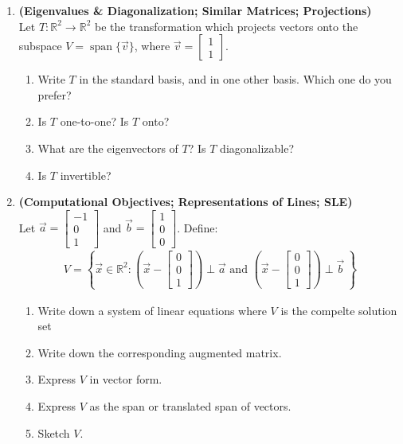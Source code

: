 \documentclass[red]{tutorial}
\newcommand{\R}{\mathbb{R}}
\newcommand{\mat}[1]{\begin{bmatrix} #1 %
\end{bmatrix}}
\DeclareMathOperator{\Span} {span}
\theoremstyle{definition}
\theoremstyle{theorem}
\begin{document}
\begin{tutorial}
\begin{enumerate}
        \item \textbf{(Eigenvalues \& Diagonalization; Similar Matrices; 
          Projections)}\\
          Let $T\colon\R^2\to\R^2$ be the transformation which 
          projects vectors onto the subspace $V=\Span\{\vec v\}$, 
          where $\vec v = \mat{1\\1}$.
          \begin{enumerate}
            \item Write $T$ in the standard basis, and in one other basis. 
              Which one do you prefer?
            \item Is $T$ one-to-one? Is $T$ onto?
            \item What are the eigenvectors of $T$? Is $T$ diagonalizable?
            \item Is $T$ invertible?
          \end{enumerate}
        \item \textbf{(Computational Objectives; Representations of Lines; 
          SLE)}\\
          Let $\vec a = \mat{-1\\0\\1}$ and $\vec b = \mat{1\\0\\0}$. 
          Define:
          \begin{align*}
            V = \left\{\vec x\in \R^2: %
            \left(\vec x - \mat{0\\0\\1}\right)\perp \vec a \text{ and } 
            \left(\vec x - \mat{0\\0\\1}\right)\perp \vec b\ \right\}
          \end{align*}
          \begin{enumerate}
            \item Write down a system of linear equations where 
              $V$ is the compelte solution set
            \item Write down the corresponding augmented matrix.
            \item Express $V$ in vector form.
            \item Express $V$ as the span or translated span of 
              vectors.
            \item Sketch $V$.
          \end{enumerate}
      \end{enumerate}
    \end{tutorial}
\end{document}
